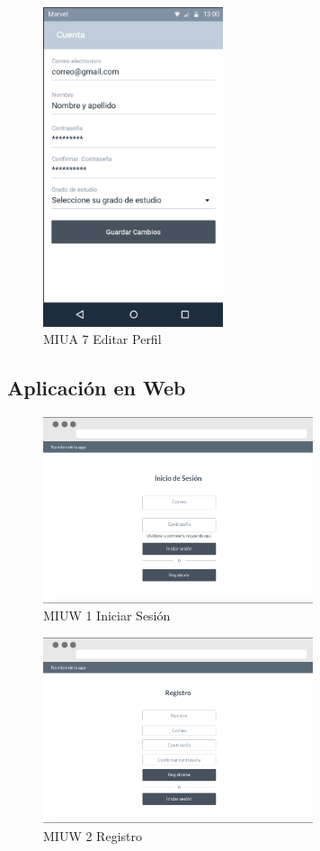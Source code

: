 \begin{figure}[H]
	\centering
	\includegraphics[width=200px]{capitulo4/imagenes/android/MIUA_7.png}
	\caption{MIUA 7 Editar Perfil}
	\label{fig:MIUA-7} %
\end{figure}

\newpage
\subsection{Aplicación en Web}
\begin{figure}[H]
	\centering
	\includegraphics[width=300px]{capitulo4/imagenes/web/IUW_1.png}
	\caption{MIUW 1 Iniciar Sesión}
	\label{fig:MIUW-1}
\end{figure}

\begin{figure}[H]
	\centering
	\includegraphics[width=300px]{capitulo4/imagenes/web/IUW_2.png}
	\caption{MIUW 2 Registro}
	\label{fig:MIUW-2}
\end{figure}

